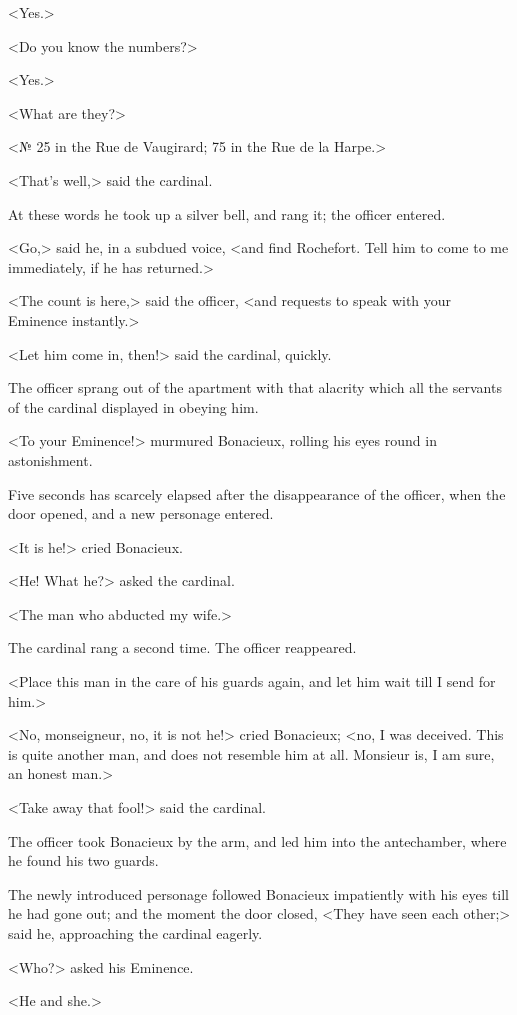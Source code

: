 <Yes.> 

<Do you know the numbers?> 

<Yes.> 

<What are they?> 

<№ 25 in the Rue de Vaugirard; 75 in the Rue de la Harpe.> 

<That's well,> said the cardinal. 

At these words he took up a silver bell, and rang it; the officer entered. 

<Go,> said he, in a subdued voice, <and find Rochefort. Tell him to come to me immediately, if he has returned.> 

<The count is here,> said the officer, <and requests to speak with your Eminence instantly.> 

<Let him come in, then!> said the cardinal, quickly. 

The officer sprang out of the apartment with that alacrity which all the servants of the cardinal displayed in obeying him. 

<To your Eminence!> murmured Bonacieux, rolling his eyes round in astonishment. 

Five seconds has scarcely elapsed after the disappearance of the officer, when the door opened, and a new personage entered. 

<It is he!> cried Bonacieux. 

<He! What he?> asked the cardinal. 

<The man who abducted my wife.> 

The cardinal rang a second time. The officer reappeared. 

<Place this man in the care of his guards again, and let him wait till I send for him.> 

<No, monseigneur, no, it is not he!> cried Bonacieux; <no, I was deceived. This is quite another man, and does not resemble him at all. Monsieur is, I am sure, an honest man.> 

<Take away that fool!> said the cardinal. 

The officer took Bonacieux by the arm, and led him into the antechamber, where he found his two guards. 

The newly introduced personage followed Bonacieux impatiently with his eyes till he had gone out; and the moment the door closed, <They have seen each other;> said he, approaching the cardinal eagerly. 

<Who?> asked his Eminence. 

<He and she.> 

